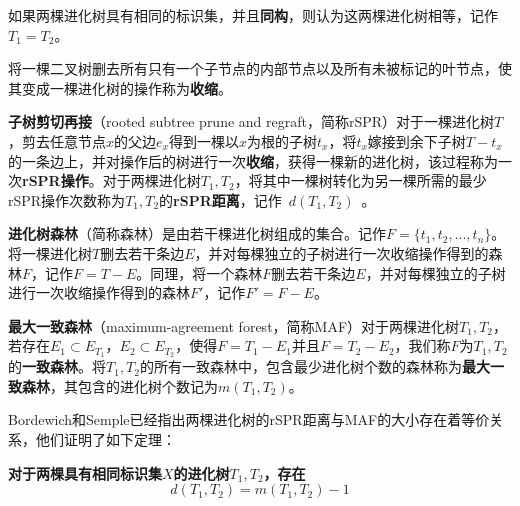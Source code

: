 \begin{dingyi}
如果两棵进化树具有相同的标识集，并且\textbf{同构}，则认为这两棵进化树相等，记作\textbf{$T_1 = T_2$}。
\end{dingyi}

\begin{dingyi}
将一棵二叉树删去所有只有一个子节点的内部节点以及所有未被标记的叶节点，使其变成一棵进化树的操作称为\textbf{收缩}。
\end{dingyi}

\begin{dingyi}
\textbf{子树剪切再接}（rooted subtree prune and regraft，简称rSPR）对于一棵进化树$T$，剪去任意节点$x$的父边$e_x$得到一棵以$x$为根的子树$t_x$，将$t_x$嫁接到余下子树$T-t_x$的一条边上，并对操作后的树进行一次\textbf{收缩}，获得一棵新的进化树，该过程称为一次\textbf{rSPR操作}。对于两棵进化树$T_1,T_2$，将其中一棵树转化为另一棵所需的最少rSPR操作次数称为$T_1,T_2$的\textbf{rSPR距离}，记作~$d(T_1,T_2)$~。
\end{dingyi}

\begin{dingyi}
\textbf{进化树森林}（简称森林）是由若干棵进化树组成的集合。记作$F=\{t_1,t_2,...,t_n\}$。将一棵进化树$T$删去若干条边$E$，并对每棵独立的子树进行一次收缩操作得到的森林$F$，记作\textbf{$F=T-E$}。同理，将一个森林$F$删去若干条边$E$，并对每棵独立的子树进行一次收缩操作得到的森林$F'$，记作\textbf{$F'=F-E$}。
\end{dingyi}

\begin{dingyi}
\textbf{最大一致森林}（maximum-agreement forest，简称MAF）对于两棵进化树$T_1,T_2$，若存在$E_1 \subset E_{T_1}$，$E_2 \subset E_{T_2}$，使得$F=T_1 - E_1$并且$F=T_2 - E_2$，我们称$F$为$T_1,T_2$的\textbf{一致森林}。将$T_1,T_2$的所有一致森林中，包含最少进化树个数的森林称为\textbf{最大一致森林}，其包含的进化树个数记为\textbf{$m(T_1,T_2)$}。
\end{dingyi}

Bordewich和Semple已经指出两棵进化树的rSPR距离与MAF的大小存在着等价关系，他们证明了如下定理：
\begin{dingli}
\label{dingli:1_1}
\textbf{
对于两棵具有相同标识集$X$的进化树$T_1,T_2$，存在
	\begin{equation*}
		d(T_1,T_2)=m(T_1,T_2)-1
	\end{equation*}
}	
\end{dingli}

